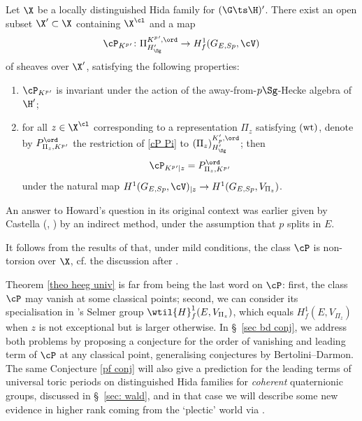 \begin{theoA} Let $\X$ be a locally distinguished Hida family for $(\G\ts\H)'$.
  There exist an open subset $\X'\subset  \X$ containing $\X^{\cl}$
  and a map
 $$\cP_{K^{p}{}'}\colon \Pi^{K^{p}{}', \ord}_{H'_{\Sg}} \to {H}^{1}_{f}(G_{E, Sp}, \cV)$$
of sheaves over $\X'$,  satisfying the following properties:
\begin{enumerate}
\item
$\cP_{K^{p}{}'}$ is invariant under the action of the away-from-$p\Sg$-Hecke algebra of $\H'$;
\item
for all  $z\in \X^{\cl}$ corresponding to a representation $\Pi_{z}$  satisfying $(\textup{wt})$,  denote by $P^{\ord}_{\Pi_{z}, K^{p}{}'}$ the restriction of \eqref{cP Pi} to  $(\Pi_{z})_{H'_{\Sg}}^{K_{p}', \ord }$; then
$$\cP_{K^{p}{}'|z}  = P^{\ord}_{\Pi_{z},K^{p}{}'}$$
under the  natural  map ${H}^{1}(G_{E, Sp}, \cV)_{|z}\to {H}^{1}_{}(G_{E, Sp}, V_{\Pi_{z}})$.
\end{enumerate}
\end{theoA}


 An answer to Howard's question in its original context was earlier given by Castella (\cite{cast}, \cite{cast2})  by an indirect method, under the assumption that   $p$ splits in $E$.

\begin{rema}
\notready It follows from the results of \cite{CV} that, under mild conditions, the class $\cP$ is non-torsion over $\X$, cf. the discussion after \cite[Theorem B]{fouquet}.
\end{rema}
\begin{rema}
\notready {}
Theorem \ref{theo heeg univ} is far from being the last word on $\cP$: first,  the class $\cP$ may vanish at some classical points; second, we can consider its specialisation in \nek's Selmer group $\wtil{H}^{1}_{f}(E, V_{\Pi_{z}})$, which equals $H^{1}_{f}(E, V_{\Pi_{z}}) $ when $z$ is not exceptional but is larger otherwise. In \S~\ref{sec bd conj}, we address both problems by proposing a conjecture for the order of vanishing and leading term of $\cP$ at any classical point, generalising conjectures by Bertolini--Darmon. The same Conjecture  \ref{pf conj} will also give a prediction for the leading terms of universal toric periods on distinguished Hida families for \emph{coherent} quaternionic groups, discussed in \S~\ref{sec: wald}, and in that case we will describe some new evidence in higher rank coming from the `plectic' world  via \cite{FG}.
\end{rema}











